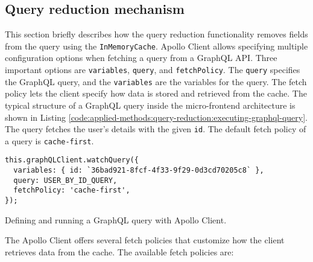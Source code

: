 \subsection{Query reduction mechanism}\label{subsection:applied-methods:query-reduction:how-does-the-library-work}

This section briefly describes how the query reduction functionality removes fields from the query using the \texttt{InMemoryCache}. Apollo Client allows specifying multiple configuration options when fetching a query from a GraphQL \ac{API}. Three important options are \texttt{variables}, \texttt{query}, and \texttt{fetchPolicy}. The \texttt{query} specifies the GraphQL query, and the \texttt{variables} are the variables for the query. The fetch policy lets the client specify how data is stored and retrieved from the cache. The typical structure of a GraphQL query inside the micro-frontend architecture is shown in Listing \ref{code:applied-methods:query-reduction:executing-graphql-query}. The query fetches the user's details with the given \texttt{id}. The default fetch policy of a query is \texttt{cache-first}.

\ifshowListings
\begin{listing}[H]
\begin{verbatim}
this.graphQLClient.watchQuery({
  variables: { id: `36bad921-8fcf-4f33-9f29-0d3cd70205c8` },
  query: USER_BY_ID_QUERY,
  fetchPolicy: 'cache-first',
});
\end{verbatim}
\caption{Defining and running a GraphQL query with Apollo Client.}\label{code:applied-methods:query-reduction:executing-graphql-query}
\end{listing}
\fi

\noindent The Apollo Client offers several fetch policies that customize how the client retrieves data from the cache. The available fetch policies are: \cite{misc:-:applied-methods:query-reduction:apollo-client:queries}

